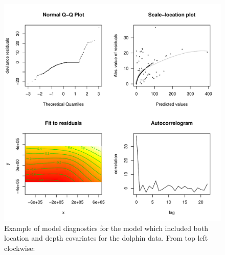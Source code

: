 \documentclass[a4paper,12pt]{article}
\begin{document}
\newpage

\begin{figure}[h!]
  \caption{Example of model diagnostics for the model which included both location and depth covariates for the dolphin data. From top left clockwise:  }
  \label{dsm-check}
  \begin{center}
    \includegraphics[width=\textwidth]{figs/dsm-check}
  \end{center}
\end{figure}
\end{document}
